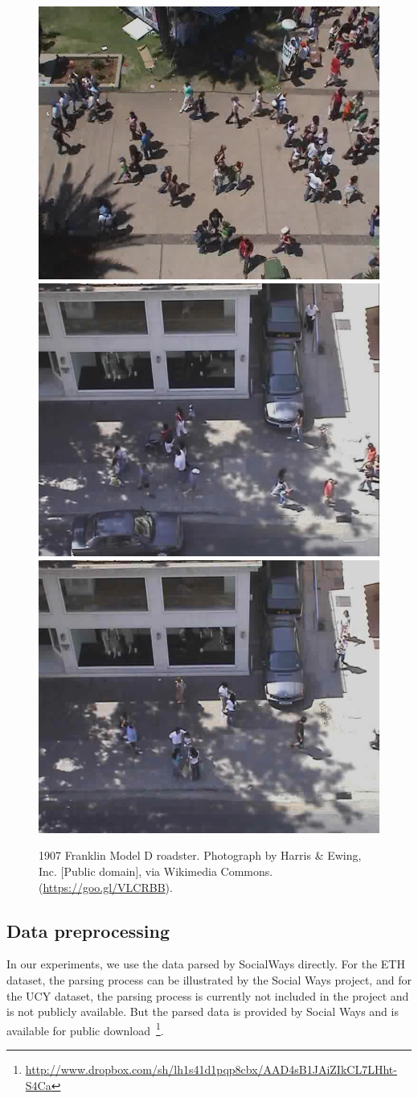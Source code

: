 \begin{figure}[h]
  \centering
  \includegraphics[width=0.40\linewidth]{./figures/students_003.jpg}
  \includegraphics[width=0.40\linewidth]{./figures/crowds_zara01.jpg}
  \\[\smallskipamount]
  \includegraphics[width=0.40\linewidth]{./figures/crowds_zara02.jpg}
  \caption{1907 Franklin Model D roadster. Photograph by Harris \&
    Ewing, Inc. [Public domain], via Wikimedia
    Commons. (\url{https://goo.gl/VLCRBB}).}\label{fig:crowds-dataset-scenes}
\end{figure}

\subsection{Data preprocessing}

In our experiments, we use the data parsed by SocialWays directly. For the ETH dataset, the parsing process can be illustrated by the Social Ways project, and for the UCY dataset, the parsing process is currently not included in the project and is not publicly available. But the parsed data is provided by Social Ways and is available for public download~\footnote{\url{http://www.dropbox.com/sh/lh1s41d1pqp8cbx/AAD4sB1JAiZIkCL7LHht-S4Ca}}.